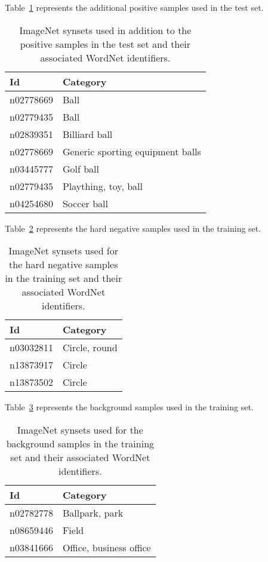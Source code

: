 \documentclass{llncs}
\begin{document}
{{			Table~\ref{tab:test_set} represents the additional positive samples used in the test set.

			\begin{table}
				\centering
				\caption{ImageNet synsets used in addition to the positive samples in the test set and their associated WordNet identifiers.}
				\label{tab:test_set}
				\begin{tabularx}{\textwidth}{lX}
					\toprule
					\textbf{Id} & \textbf{Category} \\
					\midrule
						n02778669 & Ball \\
						n02779435 & Ball \\
						n02839351 & Billiard ball \\
						n02778669 & Generic sporting equipment balls \\
						n03445777 & Golf ball \\
						n02779435 & Plaything, toy, ball \\
						n04254680 & Soccer ball \\
					\bottomrule
				\end{tabularx}
			\end{table}

			Table~\ref{tab:negative_samples} represents the hard negative samples used in the training set.

			\begin{table}
				\centering
				\caption{ImageNet synsets used for the hard negative samples in the training set and their associated WordNet identifiers.}
				\label{tab:negative_samples}
				\begin{tabularx}{\textwidth}{lX}
					\toprule
					\textbf{Id} & \textbf{Category} \\
					\midrule
						n03032811 & Circle, round \\
						n13873917 & Circle \\
						n13873502 & Circle \\
					\bottomrule
				\end{tabularx}
			\end{table}

			Table~\ref{tab:background_samples} represents the background samples used in the training set.

			\begin{table}
				\centering
				\caption{ImageNet synsets used for the background samples in the training set and their associated WordNet identifiers.}
				\label{tab:background_samples}
				\begin{tabularx}{\textwidth}{lX}
					\toprule
					\textbf{Id} & \textbf{Category} \\
					\midrule
						n02782778 & Ballpark, park \\
						n08659446 & Field \\
						n03841666 & Office, business office \\
					\bottomrule
				\end{tabularx}
			\end{table}

}}
\end{document}
